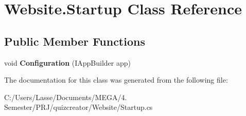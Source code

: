 \hypertarget{class_website_1_1_startup}{}\section{Website.\+Startup Class Reference}
\label{class_website_1_1_startup}
\subsection*{Public Member Functions}
\begin{DoxyCompactItemize}
\item 
\hypertarget{class_website_1_1_startup_a510c252a0bbe1235011e5f4fab7393b2}{}void {\bfseries Configuration} (I\+App\+Builder app)\label{class_website_1_1_startup_a510c252a0bbe1235011e5f4fab7393b2}

\end{DoxyCompactItemize}


The documentation for this class was generated from the following file\+:\begin{DoxyCompactItemize}
\item 
C\+:/\+Users/\+Lasse/\+Documents/\+M\+E\+G\+A/4. Semester/\+P\+R\+J/quizcreator/\+Website/Startup.\+cs\end{DoxyCompactItemize}
